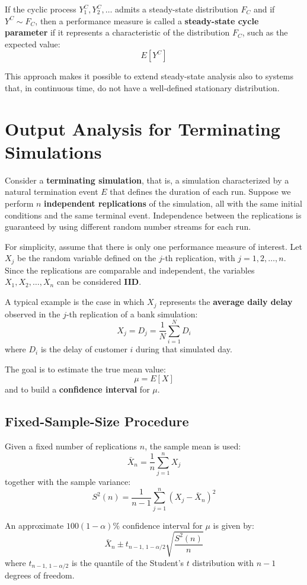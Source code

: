 If the cyclic process $Y_1^C, Y_2^C, \dots$ admits a steady-state distribution $F_C$ and if $Y^C \sim F_C$, then a performance measure is called a \textbf{steady-state cycle parameter} if it represents a characteristic of the distribution $F_C$, such as the expected value:
\[
E[Y^C]
\]

This approach makes it possible to extend steady-state analysis also to systems that, in continuous time, do not have a well-defined stationary distribution.

\section{Output Analysis for Terminating Simulations}

Consider a \textbf{terminating simulation}, that is, a simulation characterized by a natural termination event $E$ that defines the duration of each run. Suppose we perform $n$ \textbf{independent replications} of the simulation, all with the same initial conditions and the same terminal event.
Independence between the replications is guaranteed by using different random number streams for each run.

For simplicity, assume that there is only one performance measure of interest. Let $X_j$ be the random variable defined on the $j$-th replication, with $j = 1,2,\dots,n$. Since the replications are comparable and independent, the variables $X_1, X_2, \dots, X_n$ can be considered \textbf{IID}.

A typical example is the case in which $X_j$ represents the \textbf{average daily delay} observed in the $j$-th replication of a bank simulation:
\[
X_j = D_j = \frac{1}{N} \sum_{i=1}^{N} D_i
\]
where $D_i$ is the delay of customer $i$ during that simulated day.

The goal is to estimate the true mean value:
\[
\mu = E[X]
\]
and to build a \textbf{confidence interval} for $\mu$.

\subsection{Fixed-Sample-Size Procedure}
Given a fixed number of replications $n$, the sample mean is used:
\[
\bar{X}_n = \frac{1}{n} \sum_{j=1}^{n} X_j
\]
together with the sample variance:
\[
S^2(n) = \frac{1}{n-1} \sum_{j=1}^{n} (X_j - \bar{X}_n)^2
\]

An approximate $100(1-\alpha)\%$ confidence interval for $\mu$ is given by:
\[
\bar{X}_n \pm t_{n-1,\,1-\alpha/2} \sqrt{\frac{S^2(n)}{n}}
\]
where $t_{n-1,\,1-\alpha/2}$ is the quantile of the Student's $t$ distribution with $n-1$ degrees of freedom.

